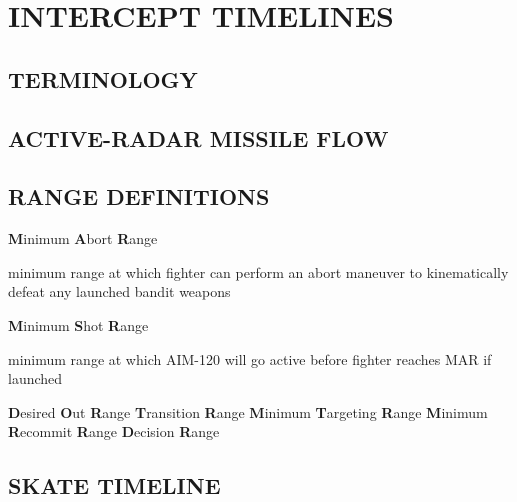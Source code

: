 \section{INTERCEPT TIMELINES}

\subsection{TERMINOLOGY}

\begin{tcoloritemize}
    \blueitem[Contact]
    \blueitem[Group]
    \blueitem[Picture]
\end{tcoloritemize}

\subsection[AR FLOW]{ACTIVE-RADAR MISSILE FLOW}

\begin{tcoloritemize}
\end{tcoloritemize}


\subsection{RANGE DEFINITIONS}

\begin{tcoloritemize}
    \blueitem[WEZ]
    \blueitem[MAR] \textbf{M}inimum \textbf{A}bort \textbf{R}ange

    \medskip
    minimum range at which fighter can perform an abort maneuver to kinematically defeat any launched bandit weapons 

    \blueitem[MSR] \textbf{M}inimum \textbf{S}hot \textbf{R}ange

    \medskip
    minimum range at which AIM-120 will go active before fighter reaches MAR if launched

    \blueitem[DOR] \textbf{D}esired \textbf{O}ut \textbf{R}ange
    \blueitem[TR] \textbf{T}ransition \textbf{R}ange
    \blueitem[MTR] \textbf{M}inimum \textbf{T}argeting \textbf{R}ange
    \blueitem[MRR] \textbf{M}inimum \textbf{R}ecommit \textbf{R}ange
    \blueitem[DR] \textbf{D}ecision \textbf{R}ange
\end{tcoloritemize}

\marginfigeometry

\subsection{SKATE TIMELINE}

